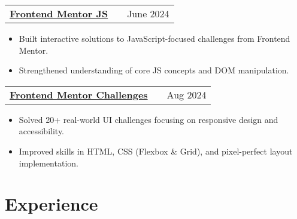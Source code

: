 \documentclass[a4paper,10pt]{article}
\makeatletter
\newenvironment{jobshort}[2]
    {
    \begin{tabularx}{\linewidth}{@{}l X r@{}}
    \textbf{#1} & \hfill &  #2 \\[3.75pt]
    \end{tabularx}
    }
    {
    }
\newenvironment{joblong}[2]
    {
    \begin{tabularx}{\linewidth}{@{}l X r@{}}
    \textbf{#1} & \hfill &  #2 \\[3.75pt]
    \end{tabularx}
    \begin{minipage}[t]{\linewidth}
    \begin{itemize}[nosep,after=\strut, leftmargin=1em, itemsep=3pt,label=--]
    }
    {
    \end{itemize}
    \end{minipage}    
    }
\makeatother
\begin{document}
    \begin{joblong}
        {\href{https://github.com/gauravgorane/Frontend_mentor_js}{Frontend Mentor JS \faExternalLink*} \normalfont{\textit{[JavaScript, DOM, Web Components]}}}{June 2024}
        \item Built interactive solutions to JavaScript-focused challenges from Frontend Mentor.
        \item Strengthened understanding of core JS concepts and DOM manipulation.
    \end{joblong}

    \begin{joblong}
        {\href{https://github.com/gauravgorane/Frontend_Mentor}{Frontend Mentor Challenges \faExternalLink*} \normalfont{\textit{[HTML, CSS, Responsive Design]}}}{Aug 2024}
        \item Solved 20+ real-world UI challenges focusing on responsive design and accessibility.
        \item Improved skills in HTML, CSS (Flexbox \& Grid), and pixel-perfect layout implementation. 
    \end{joblong}

\section{Experience}

    
\end{document}
